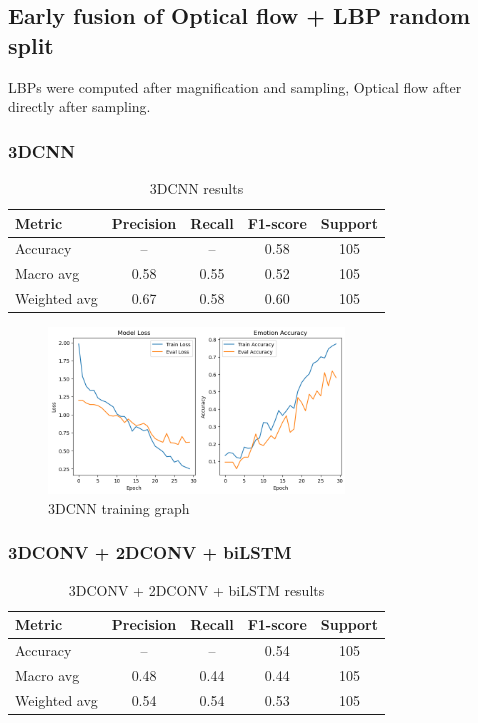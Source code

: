 \documentclass{article}
\begin{document}
\subsection{Early fusion of Optical flow + LBP random split}
LBPs were computed after magnification and sampling, Optical flow after directly after sampling.

\subsubsection{3DCNN}
\begin{table}[H]
\centering
\caption{3DCNN results}
\begin{tabular}{|l|c|c|c|c|}
\hline
\textbf{Metric} & \textbf{Precision} & \textbf{Recall} & \textbf{F1-score} & \textbf{Support} \\
\hline
Accuracy       & --   & --   & 0.58 & 105 \\
Macro avg      & 0.58 & 0.55 & 0.52 & 105 \\
Weighted avg   & 0.67 & 0.58 & 0.60 & 105 \\
\hline
\end{tabular}%
\label{tab:table7}
\end{table}

\begin{figure}[H]
  \begin{center}
    \includegraphics*[width=0.7\textwidth]{Figures/Picture11.png}
  \end{center}
  \caption{3DCNN training graph}
  \label{fig:fig11}
\end{figure}

\subsubsection{3DCONV + 2DCONV + biLSTM}

\begin{table}[H]
\centering
\caption{3DCONV + 2DCONV + biLSTM results}
\begin{tabular}{|l|c|c|c|c|}
\hline
\textbf{Metric} & \textbf{Precision} & \textbf{Recall} & \textbf{F1-score} & \textbf{Support} \\
\hline
Accuracy       & --   & --   & 0.54 & 105 \\
Macro avg      & 0.48 & 0.44 & 0.44 & 105 \\
Weighted avg   & 0.54 & 0.54 & 0.53 & 105 \\
\hline
\end{tabular}%
\label{tab:table8}
\end{table}
\end{document}
